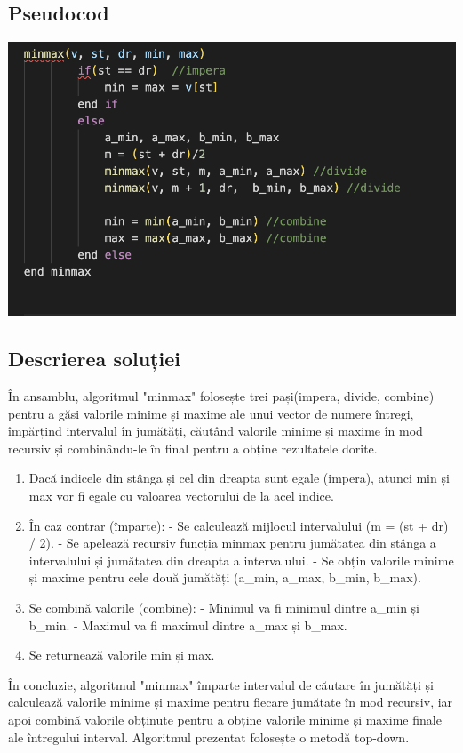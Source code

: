 \documentclass[runningheads]{llncs}
\begin{document}
\subsection{Pseudocod}

\begin{center}
    \includegraphics[scale=0.6]{p1.png}
\end{center}

\subsection{Descrierea soluției}
În ansamblu, algoritmul "minmax" folosește trei pași(impera, divide, combine) pentru a găsi valorile minime și maxime ale unui vector de numere întregi, împărțind intervalul în jumătăți, căutând valorile minime și maxime în mod recursiv și combinându-le în final pentru a obține rezultatele dorite. \newline
\begin{enumerate}

 \item Dacă indicele din stânga și cel din dreapta sunt egale (impera), atunci min și max vor fi egale cu valoarea vectorului de la acel indice.
\item În caz contrar (împarte):\newline
- Se calculează mijlocul intervalului (m = (st + dr) / 2).\newline
- Se apelează recursiv funcția minmax pentru jumătatea din stânga a intervalului și jumătatea din dreapta a intervalului.\newline
- Se obțin valorile minime și maxime pentru cele două jumătăți (a\_min, a\_max, b\_min, b\_max).\newline
\item Se combină valorile (combine):\newline
- Minimul va fi minimul dintre a\_min și b\_min.\newline
- Maximul va fi maximul dintre a\_max și b\_max.\newline
\item Se returnează valorile min și max.
 \end{enumerate}
În concluzie, algoritmul "minmax" împarte intervalul de căutare în jumătăți și calculează valorile minime și maxime pentru fiecare jumătate în mod recursiv, iar apoi combină valorile obținute pentru a obține valorile minime și maxime finale ale întregului interval.\newline
Algoritmul prezentat folosește o metodă top-down.
\end{document}
